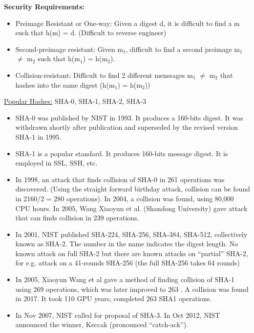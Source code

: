 \documentclass[10pt,landscape]{article}
\begin{document}
\begin{multicols*}{3}
\textbf{Security Requirements:}
\begin{itemize}[noitemsep,wide=0pt, leftmargin=\dimexpr{} + 2\relax]
    \item Preimage Resistant or One-way: Given a digest d, it is difficult to find a m such that h(m) = d. (Difficult to reverse engineer)
    \item Second-preimage resistant: Given m$_1$, difficult to find a second preimage m$_1$ $\ne$ m$_2$ such that h(m$_1$) = h(m$_2$).
    \item Collision-resistant: Difficult to find 2 different menssages m$_1$ $\ne$ m$_2$ that hashes into the same digest (h(m$_1$) = h(m$_2$))
\end{itemize}

\underline{Popular Hashes:} SHA-0, SHA-1, SHA-2, SHA-3
\begin{itemize}
    \item SHA-0 was published by NIST in 1993. It produces a 160-bits digest. It was withdrawn
    shortly after publication and superseded by the revised version SHA-1 in 1995.
    \item SHA-1 is a popular standard. It produces 160-bits message digest. It is employed in SSL,
    SSH, etc.
    \item In 1998, an attack that finds collision of SHA-0 in 261 operations was discovered. (Using
    the straight forward birthday attack, collision can be found in 2160/2 = 280 operations). In
    2004, a collision was found, using 80,000 CPU hours. In 2005, Wang Xiaoyun et al.
    (Shandong University) gave attack that can finds collision in 239 operations.
    \item In 2001, NIST published SHA-224, SHA-256, SHA-384, SHA-512, collectively known as SHA-2.
    The number in the name indicates the digest length. No known attack on full SHA-2 but
    there are known attacks on “partial” SHA-2, for e.g. attack on a 41-rounds SHA-256 (the full
    SHA-256 takes 64 rounds)
    \item In 2005, Xiaoyun Wang et al gave a method of finding collision of SHA-1 using 269
    operations, which was later improved to 263 . A collision was found in 2017. It took 110
    GPU years, completed 263 SHA1 operations.
    \item In Nov 2007, NIST called for proposal of SHA-3. In Oct 2012, NIST announced the winner,
    Keccak (pronounced “catch-ack”). 
\end{itemize}


\end{multicols*}
\end{document}
